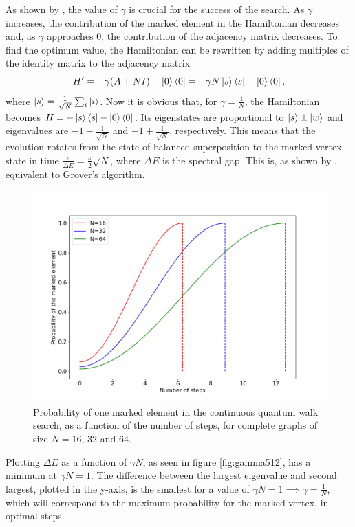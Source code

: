 \documentclass[../../dissertation.tex]{subfiles}
\begin{document}
As shown by \cite{childs2004}, the value of $\gamma$ is crucial for the
success of the search. As $\gamma$ increases, the contribution of the marked
element in the Hamiltonian decreases and, as $\gamma$ approaches $0$, the
contribution of the adjacency matrix decreases. To find the optimum value, the
Hamiltonian can be rewritten by adding multiples of the identity matrix to the
adjacency matrix 
\begin{equation}
	H' = -\gamma(A+NI) - \ket{0}\bra{0} = -\gamma N\ket{s}\bra{s} - \ket{0}\bra{0},
\end{equation}
where $\ket{s} = \frac{1}{\sqrt{N}}\sum_i \ket{i}$. Now it is obvious that, for
$\gamma = \frac{1}{N}$, the Hamiltonian becomes $H = -\ket{s}\bra{s} -
\ket{0}\bra{0}$. Its eigenstates are proportional to $\ket{s}\pm\ket{w}$ and
eigenvalues are $-1 - \frac{1}{\sqrt{N}}$ and $-1 + \frac{1}{\sqrt{N}}$,
respectively. This means that the evolution rotates from the state of balanced
superposition to the marked vertex state in time $\frac{\pi}{\Delta E} =
\frac{\pi}{2}\sqrt{N}$, where $\Delta E$ is the spectral gap. This is, as shown by \cite{farhi2000}, equivalent to
Grover's algorithm.
\begin{figure}[!ht]
	\centering \includegraphics[scale=0.40]{img/ContQuantumWalk/Search/163264.png}
	\caption{Probability of one marked element in the continuous quantum walk search, as a function of the number of steps, for complete graphs of size $N=16$, $32$ and $64$.}\label{fig:ContSearchProbDist}
\end{figure}\par
Plotting $\Delta E$ as a function of $\gamma N$, as seen in figure
\ref{fig:gamma512}, has a minimum at $\gamma N =1$. The difference between the
largest eigenvalue and second largest, plotted in the y-axis, is the smallest
for a value of $\gamma N = 1 \implies \gamma =\frac{1}{N}$, which will
correspond to the maximum probability for the marked vertex, in optimal steps.\par
\end{document}

